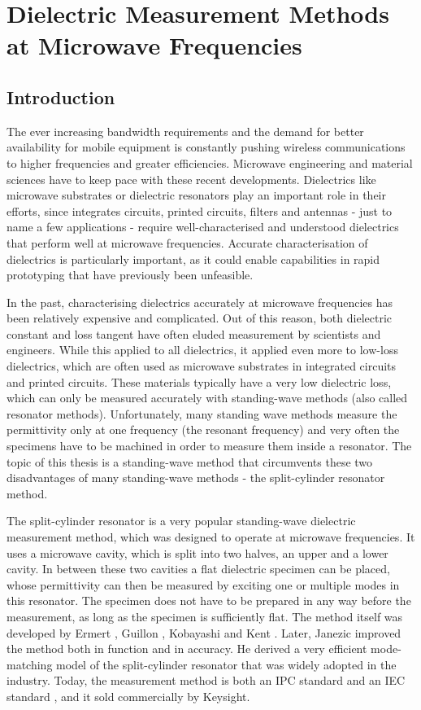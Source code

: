 \chapter{Dielectric Measurement Methods at Microwave Frequencies}\label{ch:methods}
\section{Introduction}
The ever increasing bandwidth requirements and the demand for better availability for mobile equipment is constantly pushing wireless communications to higher frequencies and greater efficiencies. Microwave engineering and material sciences have to keep pace with these recent developments. Dielectrics like microwave substrates or dielectric resonators play an important role in their efforts, since integrates circuits, printed circuits, filters and antennas - just to name a few applications - require well-characterised and understood dielectrics that perform well at microwave frequencies. Accurate characterisation of dielectrics is particularly important, as it could enable capabilities in rapid prototyping that have previously been unfeasible.

In the past, characterising dielectrics accurately at microwave frequencies has been relatively expensive and complicated. Out of this reason, both dielectric constant and loss tangent have often eluded measurement by scientists and engineers. While this applied to all dielectrics, it applied even more to low-loss dielectrics, which are often used as microwave substrates in integrated circuits and printed circuits. These materials typically have a very low dielectric loss, which can only be measured accurately with standing-wave methods (also called resonator methods). Unfortunately, many standing wave methods measure the permittivity only at one frequency (the resonant frequency) and very often the specimens have to be machined in order to measure them inside a resonator. The topic of this thesis is a standing-wave method that circumvents these two disadvantages of many standing-wave methods - the split-cylinder resonator method. 

The split-cylinder resonator is a very popular standing-wave dielectric measurement method, which was designed to operate at microwave frequencies. It uses a microwave cavity, which is split into two halves, an upper and a lower cavity. In between these two cavities a flat dielectric specimen can be placed, whose permittivity can then be measured by exciting one or multiple modes in this resonator. The specimen does not have to be prepared in any way before the measurement, as long as the specimen is sufficiently flat. The method itself was developed by Ermert \cite{ermert}, Guillon \cite{guillon}, Kobayashi \cite{kobayashi} and Kent \cite{kent1996}. Later, Janezic \cite{janezic} improved the method both in function and in accuracy. He derived a very efficient mode-matching model of the split-cylinder resonator that was widely adopted in the industry. Today, the measurement method is both an IPC standard \cite{ipcSC} and an IEC standard \cite{iecSC}, and it sold commercially by Keysight.


